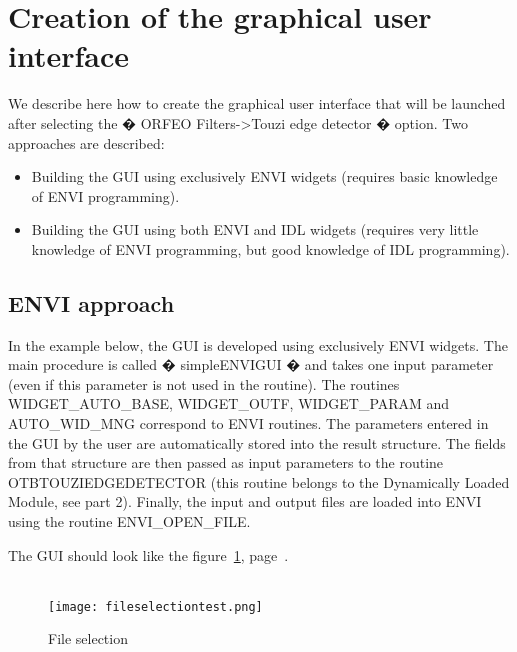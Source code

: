 \section{Creation of the graphical user interface}
We describe here how to create the graphical user interface that will be launched after selecting the � ORFEO Filters->Touzi edge detector � option. Two approaches are described:
 \begin{itemize}
    \item Building the GUI using exclusively ENVI widgets (requires basic knowledge of ENVI programming).
    \item Building the GUI using both ENVI and IDL widgets (requires very little knowledge of ENVI programming, 
        but good knowledge of IDL programming).
\end{itemize}

\subsection{ENVI approach}
In the example below, the GUI is developed using exclusively ENVI widgets. The main procedure is called � simpleENVIGUI � 
and takes one input parameter (even if this parameter is not used in the routine). The routines WIDGET\_AUTO\_BASE, WIDGET\_OUTF, WIDGET\_PARAM 
and AUTO\_WID\_MNG correspond to ENVI routines. The parameters entered in the GUI by the user are automatically stored into the result structure. 
The fields from that structure are then passed as input parameters to the routine OTBTOUZIEDGEDETECTOR (this routine belongs to the Dynamically Loaded Module, see part 2).
Finally, the input and output files are loaded into ENVI using the routine ENVI\_OPEN\_FILE.

The GUI should look like the figure~\ref{fileselectiontest}, page~\pageref{fileselectiontest}.
\\
\\
\begin{figure}
\label{fileselectiontest}
\begin{center}
\texttt{[image: fileselectiontest.png]}
\caption{File selection}
\end{center}
\end{figure}


